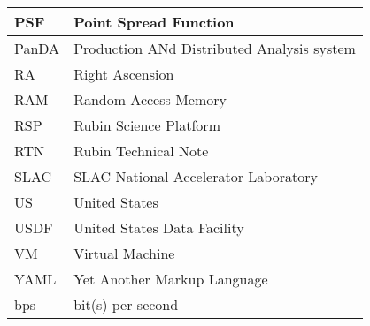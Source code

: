 \begin{longtable}{p{}p{}}
PSF & Point Spread Function \\\hline
PanDA &  Production ANd Distributed Analysis system \\\hline
RA & Right Ascension \\\hline
RAM & Random Access Memory \\\hline
RSP & Rubin Science Platform \\\hline
RTN & Rubin Technical Note \\\hline
SLAC & SLAC National Accelerator Laboratory \\\hline
US & United States \\\hline
USDF & United States Data Facility \\\hline
VM & Virtual Machine \\\hline
YAML & Yet Another Markup Language \\\hline
bps & bit(s) per second \\\hline
\end{longtable}

